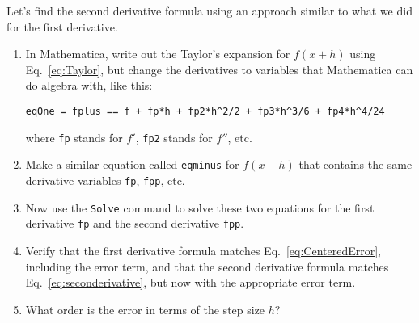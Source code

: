 \begin{enumerate}
\prob \label{P:1.fppDeriv}

\begin{enumerate}
\subprob Let's find the second derivative formula using an
    approach similar to what we did for the first derivative.
\begin{enumerate}    
\item  In Mathematica, write out the Taylor's expansion for
    $f(x+h)$ using Eq.~\eqref{eq:Taylor}, but change the
    derivatives to variables that Mathematica can do algebra
    with, like this:
\begin{Verbatim}
eqOne = fplus == f + fp*h + fp2*h^2/2 + fp3*h^3/6 + fp4*h^4/24
\end{Verbatim}
    where {\tt fp} stands for $f'$, {\tt fp2} stands for
    $f''$, etc. 
\item Make a similar equation called {\tt eqminus}
    for $f(x-h)$ that contains the same derivative variables
    {\tt fp}, {\tt fpp}, etc. 
\item Now use the \texttt{Solve} command to solve these two equations
    for the first derivative {\tt fp} and the second
    derivative {\tt fpp}. 
\item Verify that the first derivative
    formula matches Eq.~\eqref{eq:CenteredError}, including
    the error term, and that the second derivative formula
    matches Eq.~\eqref{eq:seconderivative}, but now with the
    appropriate error term. 
\item What order is the error in terms
    of the step size $h$?
\end{enumerate}
%
\end{enumerate}
\end{enumerate}


